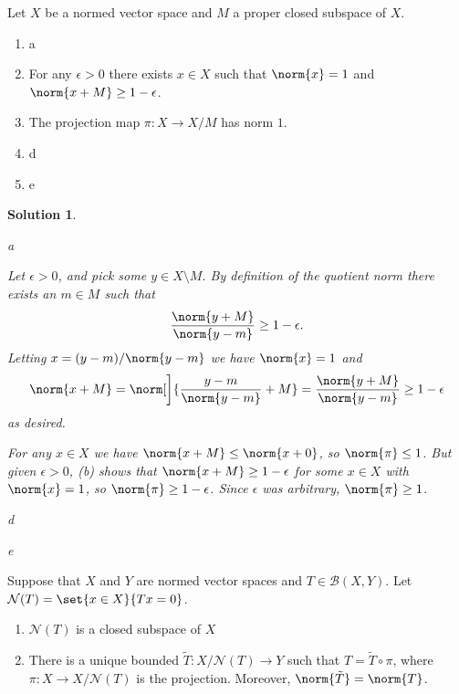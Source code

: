 \documentclass[article, a4paper, 11pt, oneside]{memoir}
\numberwithin{equation}{chapter}
\newcommand{\calB}{\mathcal{B}}
\newcommand{\calN}{\mathcal{N}}
\theoremstyle{nonumberplain}
\newtheorem{solution}{Solution}
\begin{document}
\begin{exerciseframed*}[12]
	Let $X$ be a normed vector space and $M$ a proper closed subspace of $X$.
	\begin{enumerate}
		\item a
		\item For any $\epsilon > 0$ there exists $x \in X$ such that $\norm{x} = 1$ and $\norm{x + M} \geq 1 - \epsilon$.
		\item The projection map $\pi \colon X \to X/M$ has norm $1$.
		\item d
		\item e
	\end{enumerate}
\end{exerciseframed*}

\begin{solution}
\begin{solutionsec}
	\item a
	
	\item Let $\epsilon > 0$, and pick some $y \in X \setminus M$. By definition of the quotient norm there exists an $m \in M$ such that
	\begin{equation*}
		\frac{\norm{y+M}}{\norm{y-m}}
			\geq 1 - \epsilon.
	\end{equation*}
	Letting $x = (y-m)/\norm{y-m}$ we have $\norm{x} = 1$ and
	\begin{equation*}
		\norm{x + M}
			= \norm[\bigg]{ \frac{y-m}{\norm{y-m}} + M }
			= \frac{\norm{y + M}}{\norm{y-m}}
			\geq 1 - \epsilon
	\end{equation*}
	as desired.
	
	\item For any $x \in X$ we have $\norm{x + M} \leq \norm{x + 0}$, so $\norm{\pi} \leq 1$. But given $\epsilon > 0$, (b) shows that $\norm{x + M} \geq 1 - \epsilon$ for some $x \in X$ with $\norm{x} = 1$, so $\norm{\pi} \geq 1 - \epsilon$. Since $\epsilon$ was arbitrary, $\norm{\pi} \geq 1$.

	\item d
	\item e
\end{solutionsec}
\end{solution}


\begin{exerciseframed*}[15]
	Suppose that $X$ and $Y$ are normed vector spaces and $T \in \calB(X,Y)$. Let $\calN(T) = \set{x \in X}{Tx = 0}$.
	\begin{enumerate}
		\item $\calN(T)$ is a closed subspace of $X$
		\item There is a unique bounded $\tilde{T} \colon X/\calN(T) \to Y$ such that $T = \tilde{T} \circ \pi$, where $\pi \colon X \to X/\calN(T)$ is the projection. Moreover, $\norm{\tilde{T}} = \norm{T}$.
	\end{enumerate}
\end{exerciseframed*}
\end{document}
